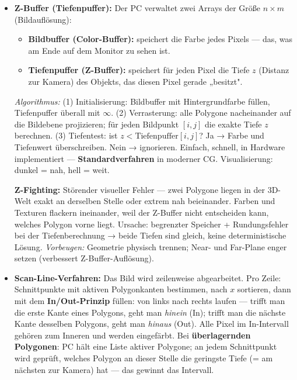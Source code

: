 \documentclass[12pt, a4paper]{article}
\begin{document}
\begin{itemize}
  \item \textbf{Z-Buffer (Tiefenpuffer):} Der PC verwaltet zwei Arrays der Größe $n \times m$ (Bildauflösung):
  \begin{itemize}
    \item \textbf{Bildbuffer (Color-Buffer):} speichert die Farbe jedes Pixels — das, was am Ende auf dem Monitor zu sehen ist.
    \item \textbf{Tiefenpuffer (Z-Buffer):} speichert für jeden Pixel die Tiefe $z$ (Distanz zur Kamera) des Objekts, das diesen Pixel gerade „besitzt".
  \end{itemize}
  \textit{Algorithmus:} (1) Initialisierung: Bildbuffer mit Hintergrundfarbe füllen, Tiefenpuffer überall mit $\infty$. (2) Verrasterung: alle Polygone nacheinander auf die Bildebene projizieren; für jeden Bildpunkt $[i,j]$ die exakte Tiefe $z$ berechnen. (3) Tiefentest: ist $z < \text{Tiefenpuffer}[i,j]$? Ja → Farbe und Tiefenwert überschreiben. Nein → ignorieren. Einfach, schnell, in Hardware implementiert — \textbf{Standardverfahren} in moderner CG. Visualisierung: dunkel = nah, hell = weit.

  \textbf{Z-Fighting:} Störender visueller Fehler — zwei Polygone liegen in der 3D-Welt exakt an derselben Stelle oder extrem nah beieinander. Farben und Texturen flackern ineinander, weil der Z-Buffer nicht entscheiden kann, welches Polygon vorne liegt. Ursache: begrenzter Speicher + Rundungsfehler bei der Tiefenberechnung → beide Tiefen sind gleich, keine deterministische Lösung. \textit{Vorbeugen:} Geometrie physisch trennen; Near- und Far-Plane enger setzen (verbessert Z-Buffer-Auflösung).

  \item \textbf{Scan-Line-Verfahren:} Das Bild wird zeilenweise abgearbeitet. Pro Zeile: Schnittpunkte mit aktiven Polygonkanten bestimmen, nach $x$ sortieren, dann mit dem \textbf{In/Out-Prinzip} füllen: von links nach rechts laufen — trifft man die erste Kante eines Polygons, geht man \textit{hinein} (In); trifft man die nächste Kante desselben Polygons, geht man \textit{hinaus} (Out). Alle Pixel im In-Intervall gehören zum Inneren und werden eingefärbt. Bei \textbf{überlagernden Polygonen}: PC hält eine Liste aktiver Polygone; an jedem Schnittpunkt wird geprüft, welches Polygon an dieser Stelle die geringste Tiefe (= am nächsten zur Kamera) hat — das gewinnt das Intervall.


\end{itemize}
\end{document}
